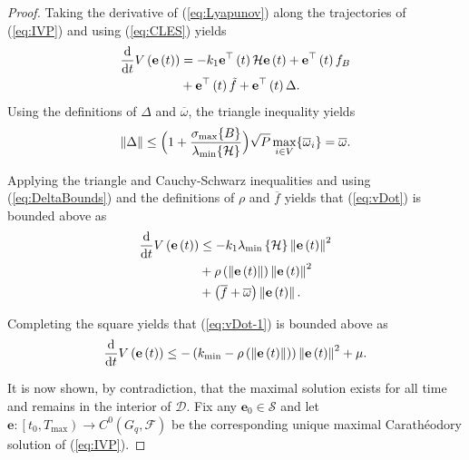 \documentclass[letterpaper, 10 pt, conference]{ieeeconf}
\newcommand{\FF}{\mathcal{F}}
\theoremstyle{definition}
\begin{document}
\begin{proof}
Taking the derivative of (\ref{eq:Lyapunov}) along the trajectories
of (\ref{eq:IVP}) and using (\ref{eq:CLES}) yields
\begin{equation}
\begin{aligned}
\frac{{\rm d}}{{\rm d}t}V\left(\mathbf{e}\left(t\right)\right) 
 & =-k_{1}\mathbf{e}^{\top}\left(t\right)\mathcal{H}\mathbf{e}\left(t\right)+\mathbf{e}^{\top}\left(t\right)f_{B} \\
 & +\mathbf{e}^{\top}\left(t\right)\tilde{f}+\mathbf{e}^{\top}\left(t\right)\Delta.
\end{aligned}
\label{eq:vDot}
\end{equation}
Using the definitions of $\Delta$ and $\overline{\omega}$, the
triangle inequality yields
\begin{equation}\label{eq:DeltaBounds}
    \|\Delta\| \leq \Bigl(1 + \frac{\sigma_\mathrm{max}\{B\}}{\lambda_\mathrm{min}\{\mathcal{H}\}}\Bigr)\sqrt{P}\max_{i\in V} \{\overline{\omega}_i \} = \overline{\omega}.
\end{equation}

Applying the triangle and Cauchy-Schwarz inequalities and using (\ref{eq:DeltaBounds})
and the definitions of $\rho$ and $\overline{f}$ yields that (\ref{eq:vDot})
is bounded above as
\begin{equation}
\begin{aligned}
\frac{{\rm d}}{{\rm d}t}V\left(\mathbf{e}\left(t\right)\right) & \leq-k_{1}\lambda_{\min}\left\{ \mathcal{H}\right\} \left\Vert \mathbf{e}\left(t\right)\right\Vert ^{2} \\
 & +\rho\left(\left\Vert \mathbf{e}\left(t\right)\right\Vert \right)\left\Vert \mathbf{e}\left(t\right)\right\Vert ^{2} \\
 & +\left(\overline{f}+\overline{\omega}\right)\left\Vert \mathbf{e}\left(t\right)\right\Vert.
\end{aligned}
\label{eq:vDot-1}
\end{equation}

Completing the square yields that (\ref{eq:vDot-1}) is bounded above as
\begin{equation}\small{}
\frac{{\rm d}}{{\rm d}t}V\left(\mathbf{e}\left(t\right)\right) \leq -\left(k_{\min}-\rho\left(\left\Vert \mathbf{e}\left(t\right)\right\Vert \right)\right)\left\Vert \mathbf{e}\left(t\right)\right\Vert ^{2}+\mu.
\label{eq:vDot-2}
\end{equation}

It is now shown, by contradiction, that the maximal solution exists
for all time and remains in the interior of $\mathcal{D}$. Fix any $\mathbf{e}_{0}\in\mathcal{S}$
and let $\mathbf{e}:\left[t_{0},T_{\max}\right)\to C^0(G_q,\FF)$ be the
corresponding unique maximal Carathéodory solution of (\ref{eq:IVP}).


\end{proof}
\end{document}
